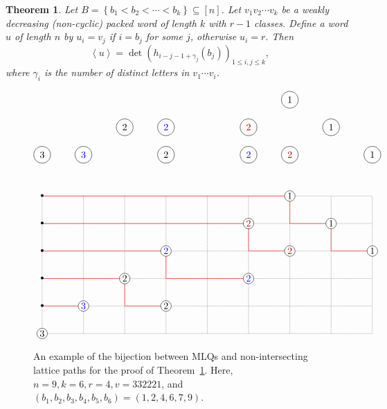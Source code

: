 \documentclass[submission]{FPSAC2018}
\newcommand{\0}{\phantom{c}}
\newcommand{\swt}[1]{\left\langle #1 \right\rangle} %
\newcommand{\set}[1]{\left\{ #1 \right\}}
\newcommand{\ive}[1]{\left[ #1 \right]}
\theoremstyle{plain}
\newtheorem{thm}{Theorem}[section]
\theoremstyle{definition}
\numberwithin{equation}{section}
\begin{document}
\begin{thm}
\label{thm:determinant_form}
  Let $B = \set{b_1 < b_2 < \cdots < b_k} \subseteq \ive{n}$.
  Let $v_1v_2 \dotsm v_k$ be a weakly decreasing (non-cyclic) packed word of length $k$ with $r-1$ classes.
  Define a word $u$ of length $n$ by $u_i = v_j$ if $i = b_j$ for some $j$, otherwise $u_i = r$.
  Then
  \[
  \swt{u} = \det( h_{i-j-1+\gamma_j}(b_j) )_{1\leq i,j\leq k},
  \]
  where $\gamma_i$ is the number of distinct letters in $v_1\dotsm v_i$.
\end{thm}

\begin{figure}[t]
\[
\begin{tikzpicture}[xscale=1.5]
  \begin{scope}[yshift=7.5cm]
    \node[circle,draw=black] at  (1, 0){3};
    \node[circle,draw=black,text=blue] at  (2, 0){3};
    \node[circle,draw=black] at  (4, 0){2};
    \node[circle,draw=black,text=blue] at  (6, 0){2};
    \node[circle,draw=black,text=darkred] at  (7, 0){2};
    \node[circle,draw=black] at  (9, 0){1};
    \node[circle,draw=black] at  (3, 1){2};
    \node[circle,draw=black,text=blue] at  (4, 1){2};
    \node[circle,draw=black,text=darkred] at  (6, 1){2};
    \node[circle,draw=black] at  (8, 1){1};
    \node[circle,draw=black] at  (7, 2){1};
  \end{scope}

  \draw[densely dotted] (1,1) grid (9,6);

  \draw[draw=red] (1,2)--(2,2);
  \draw[draw=red] (1,3)--(3,3)--(3,2)--(4,2);
  \draw[draw=red] (1,4)--(4,4)--(4,3)--(6,3);
  \draw[draw=red] (1,5)--(6,5)--(6,4)--(7,4);
  \draw[draw=red] (1,6)--(7,6)--(7,5)--(8,5)--(8,4)--(9,4);
  
  \node[circle,fill=white,draw=black,inner sep=1pt] at (1,1) {$3$};
  \node[circle,fill=white,draw=black,text=blue,inner sep=1pt] at (2,2) {$3$};
  \node[circle,fill=white,draw=black,inner sep=1pt] at (4,2) {$2$};
  \node[circle,fill=white,draw=black,inner sep=1pt] at (3,3) {$2$};
  \node[circle,fill=white,draw=black,text=blue,inner sep=1pt] at (4,4) {$2$};
  \node[circle,fill=white,draw=black,text=blue,inner sep=1pt] at (6,3) {$2$};
  \node[circle,fill=white,draw=black,text=darkred,inner sep=1pt] at (6,5) {$2$};
  \node[circle,fill=white,draw=black,text=darkred,inner sep=1pt] at (7,4) {$2$};
  \node[circle,fill=white,draw=black,inner sep=1pt] at (7,6) {$1$};
  \node[circle,fill=white,draw=black,inner sep=1pt] at (8,5) {$1$};
  \node[circle,fill=white,draw=black,inner sep=1pt] at (9,4) {$1$};

  \foreach \i in {2,...,6} {
    \node at (1,\i){\textbullet};
  }
\end{tikzpicture}
\]
\caption{An example of the bijection between MLQs and non-intersecting lattice paths for the proof of Theorem~\ref{thm:determinant_form}. Here, $n = 9, k = 6, r = 4, v = 332221$, and $(b_1,b_2,b_3,b_4,b_5,b_6) = (1,2,4,6,7,9)$.}
\label{fig:lattice_path_bijection}
\end{figure}
\end{document}
